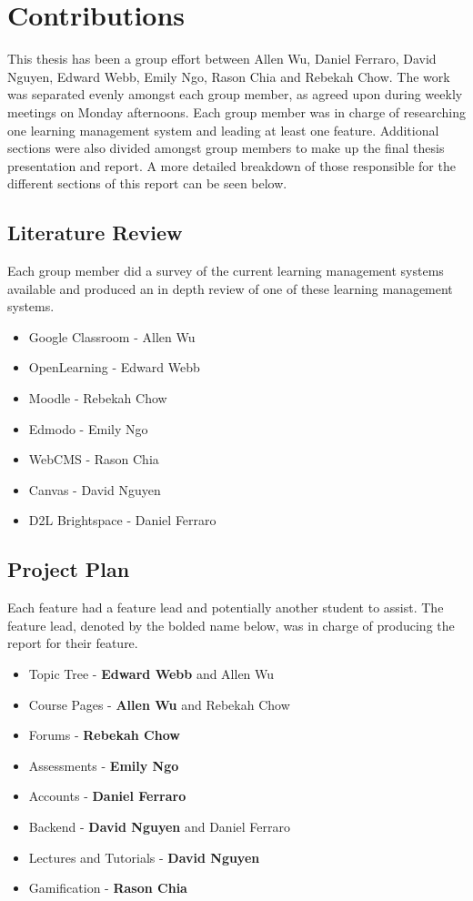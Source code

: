 \chapter*{Contributions}

This thesis has been a group effort between Allen Wu, Daniel Ferraro, David Nguyen, Edward Webb, Emily Ngo, Rason Chia and Rebekah Chow.
The work was separated evenly amongst each group member, as agreed upon during weekly meetings on Monday afternoons.
Each group member was in charge of researching one learning management system and leading at least one feature.
Additional sections were also divided amongst group members to make up the final thesis presentation and report.
A more detailed breakdown of those responsible for the different sections of this report can be seen below.

\section{Literature Review}
Each group member did a survey of the current learning management systems available and produced an in depth review of one of these learning management systems.

\begin{itemize}
    \item Google Classroom - Allen Wu
    \item OpenLearning - Edward Webb
    \item Moodle - Rebekah Chow
    \item Edmodo - Emily Ngo
    \item WebCMS - Rason Chia
    \item Canvas - David Nguyen
    \item D2L Brightspace - Daniel Ferraro
\end{itemize}

\section{Project Plan}
Each feature had a feature lead and potentially another student to assist.
The feature lead, denoted by the bolded name below, was in charge of producing the report for their feature.

\begin{itemize}
    \item Topic Tree - \textbf{Edward Webb} and Allen Wu
    \item Course Pages - \textbf{Allen Wu} and Rebekah Chow
    \item Forums - \textbf{Rebekah Chow}
    \item Assessments - \textbf{Emily Ngo}
    \item Accounts - \textbf{Daniel Ferraro}
    \item Backend - \textbf{David Nguyen} and Daniel Ferraro
    \item Lectures and Tutorials - \textbf{David Nguyen}
    \item Gamification - \textbf{Rason Chia}
\end{itemize}

